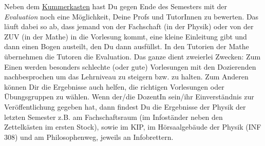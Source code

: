 \newpage{}
\label{eval}

\noindent Neben dem \hyperref[kummerkasten]{Kummerkasten} hast Du gegen Ende des Semesters mit der \emph{Evaluation} noch eine Möglichkeit, Deine Profs und TutorInnen zu bewerten. Das läuft dabei so ab, dass jemand von der Fachschaft (in der Physik) oder von der ZUV (in der Mathe) in die Vorlesung kommt, eine kleine Einleitung gibt und dann einen Bogen austeilt, den Du dann ausfüllst. In den Tutorien der Mathe übernehmen die Tutoren die Evaluation.  Das ganze dient zweierlei Zwecken: Zum Einen werden besonders schlechte (oder gute) Vorlesungen mit den Dozierenden nachbesprochen um das Lehrniveau zu steigern bzw. zu halten. Zum Anderen können Dir die Ergebnisse auch helfen, die richtigen Vorlesungen oder Übungsgruppen zu wählen. Wenn der/die DozentIn sein/ihr Einverständnis zur Veröffentlichung gegeben hat, dann findest Du die Ergebnisse der Physik der letzten Semester z.B. am Fachschaftsraum (im Infoständer neben den Zettelkästen im ersten Stock), sowie im \gls{KIP}, im Hörsaalgebäude der Physik (\Gls{INF} 308) und am Philosophenweg, jeweils an Infobrettern.
